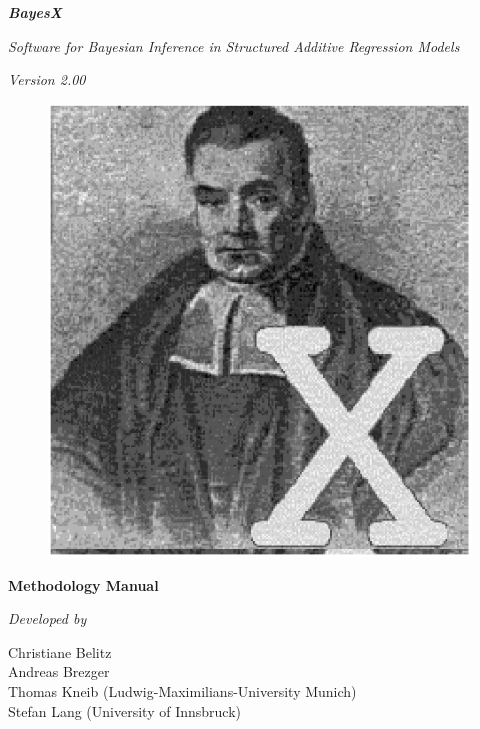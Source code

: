 \documentclass[11pt,a4paper,twoside]{bayesxarticle}
\begin{document}
\MakeShortVerb{\#}

\thispagestyle{empty}

\begin{center}
{\bf \em \huge BayesX}

\vspace{0.5cm}

 {\em \large Software for Bayesian Inference in Structured Additive Regression Models}

\vspace{0.5cm}

 {\em Version 2.00}

\vspace{0.5cm}

\begin{figure}[h]
\begin{center}
\includegraphics[scale=1.2]{grafiken/bayesicon.eps}
\end{center}
\end{figure}

\vfill

{\bf\sffamily \huge Methodology Manual}

\vfill

\end{center}

{\em Developed by}

Christiane Belitz \\
Andreas Brezger\\
Thomas Kneib (Ludwig-Maximilians-University Munich)\\
Stefan Lang (University of Innsbruck)
\end{document}
